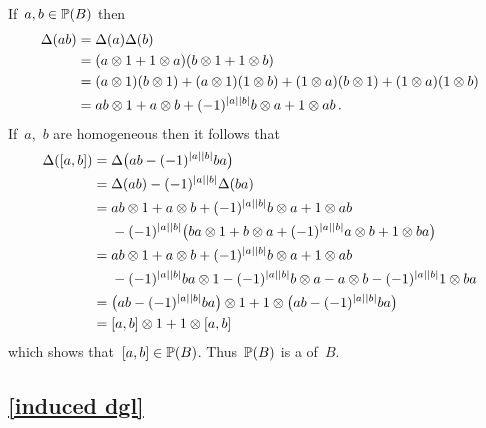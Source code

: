 \begin{enumerate}
    If~$a, b \in \mathbb{P}(B)$ then
    \begin{align*}
      \Delta(ab)
      &=
      \Delta(a) \Delta(b)
      \\
      &=
      (a \otimes 1 + 1 \otimes a)
      (b \otimes 1 + 1 \otimes b)
      \\
      &=
        (a \otimes 1)(b \otimes 1)
      + (a \otimes 1)(1 \otimes b)
      + (1 \otimes a)(b \otimes 1)
      + (1 \otimes a)(1 \otimes b)
      \\
      &=
        ab \otimes 1
      + a \otimes b
      + (-1)^{\lvert a\rvert \lvert b\rvert}
        b \otimes a
      + 1 \otimes ab \,.
    \end{align*}
    If~$a$,~$b$ are homogeneous then it follows that
    \begingroup
    \allowdisplaybreaks
    \begin{align*}
        \Delta([a,b])
        ={}&
        \Delta\bigl( ab - (-1)^{\lvert a\rvert \lvert b\rvert} ba \bigr)
        \\
        ={}&
          \Delta(ab)
        - (-1)^{\lvert a\rvert \lvert b\rvert}
        \Delta(ba)
      \\
        ={}&
          ab \otimes 1
        + a \otimes b
        + (-1)^{\lvert a\rvert \lvert b\rvert}
          b \otimes a
        + 1 \otimes ab
      \\
        {}&
        - (-1)^{\lvert a\rvert \lvert b\rvert}
        \bigl(
            ba \otimes 1
          + b \otimes a
          + (-1)^{\lvert a\rvert \lvert b\rvert}
            a \otimes b
          + 1 \otimes ba
        \bigr)
      \\
        ={}&
          ab \otimes 1
        + a \otimes b
        + (-1)^{\lvert a\rvert \lvert b\rvert}
          b \otimes a
        + 1 \otimes ab
        \\
        {}&
        - (-1)^{\lvert a\rvert \lvert b\rvert}
          ba \otimes 1
        - (-1)^{\lvert a\rvert \lvert b\rvert}
          b \otimes a
        - a \otimes b
        - (-1)^{\lvert a\rvert \lvert b\rvert}
          1 \otimes ba
      \\
        ={}&
          \bigl( ab - (-1)^{\lvert a\rvert \lvert b\rvert} ba \bigr) \otimes 1
        + 1 \otimes \bigl( ab - (-1)^{\lvert a\rvert \lvert b\rvert} ba \bigr)
      \\
        ={}&
        [a,b] \otimes 1 + 1 \otimes [a,b]
    \end{align*}
    \endgroup
    which shows that~$[a,b] \in \mathbb{P}(B)$.
    Thus~$\mathbb{P}(B)$ is a {\dglsub} of~$B$.
\end{enumerate}

\subsection{\cref{induced dgl}}
\label{induced dgl proof}

